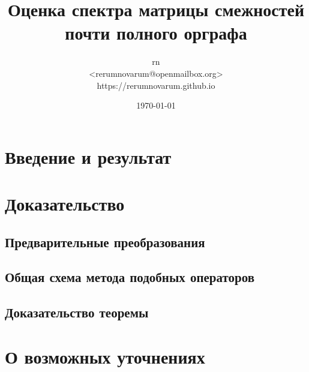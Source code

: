 \documentclass[draft,a4paper]{article}
\title{Оценка спектра матрицы смежностей почти полного орграфа}
\date{\today}
\author{
    rn\\
    <rerumnovarum@openmailbox.org>\\
    https://rerumnovarum.github.io}
\begin{document}
\maketitle

\tableofcontents
\newpage

%
\section{Введение и результат}

\section{Доказательство}
\subsection{Предварительные преобразования}


\clearpage
\subsection{Общая схема метода подобных операторов}

\subsection{Доказательство теоремы}

\section{О возможных уточнениях}




\end{document}
